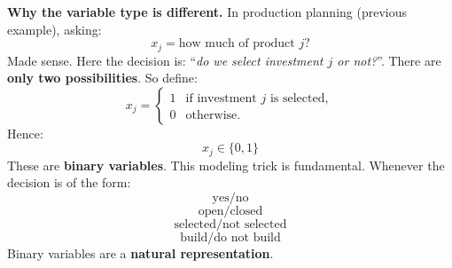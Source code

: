 \begin{examplebox}
    \highspace
    \textcolor{Green3}{ \textbf{Why the variable type is different.}} In production planning (previous example), asking:
    \begin{equation*}
        x_j=\text{how much of product }j\text{?}
    \end{equation*}
    Made sense. Here the decision is: ``\emph{do we select investment $j$ or not?}''. There are \textbf{only two possibilities}. So define:
    \begin{equation*}
        \boxed{
            x_j=
            \begin{cases}
                1 & \text{if investment }j\text{ is selected},\\
                0 & \text{otherwise}.
            \end{cases}
        }
    \end{equation*}
    Hence:
    \begin{equation*}
        x_j\in\{0,1\}
    \end{equation*}
    These are \textbf{binary variables}. This modeling trick is fundamental. Whenever the decision is of the form:
    \begin{equation*}
        \text{yes/no}
    \end{equation*}
    \begin{equation*}
        \text{open/closed}
    \end{equation*}
    \begin{equation*}
        \text{selected/not selected}
    \end{equation*}
    \begin{equation*}
        \text{build/do not build}
    \end{equation*}
    Binary variables are a \textbf{natural representation}.


\end{examplebox}
